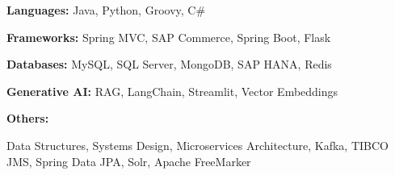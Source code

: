 
\begin{cvskills}

  \cvskill
    {\bf Languages:} %
    { Java, Python, Groovy, C\#}

  \cvskill
    {\bf Frameworks:} %
    {Spring MVC, SAP Commerce, Spring Boot, Flask}
    

\cvskill
    {\bf Databases:} %
    {MySQL, SQL Server, MongoDB, SAP HANA, Redis}

  
  \cvskill
    {\bf Generative AI:} %
    {RAG, LangChain, Streamlit, Vector Embeddings}

\cvskill
    {\bf Others:} %
    {\parbox[t]{0.95\linewidth}{Data Structures, Systems Design, Microservices Architecture, Kafka, TIBCO JMS, Spring Data JPA, Solr, Apache FreeMarker}}




\end{cvskills}
